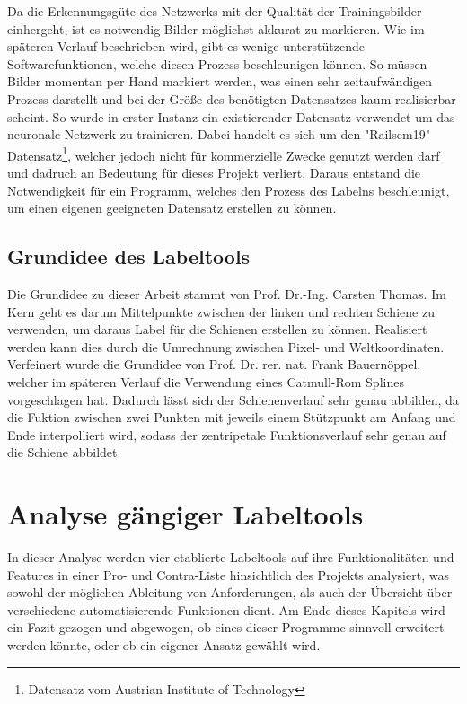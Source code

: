 \documentclass[11pt]{scrartcl}
\begin{document}
Da die Erkennungsgüte des Netzwerks mit der Qualität der Trainingsbilder einhergeht, ist es notwendig Bilder möglichst akkurat zu markieren. Wie im späteren Verlauf beschrieben wird, gibt es  wenige unterstützende Softwarefunktionen, welche diesen Prozess beschleunigen können. So müssen Bilder momentan per Hand markiert werden, was einen sehr zeitaufwändigen Prozess darstellt und bei der Größe des benötigten Datensatzes kaum realisierbar scheint. So wurde in erster Instanz ein existierender Datensatz verwendet um das neuronale Netzwerk zu trainieren. Dabei handelt es sich um den "Railsem19" Datensatz\footnote{Datensatz vom Austrian Institute of Technology}, welcher jedoch nicht für kommerzielle Zwecke genutzt werden darf und dadruch an Bedeutung für dieses Projekt verliert.
Daraus entstand die Notwendigkeit für ein Programm, welches den Prozess des Labelns beschleunigt, um einen eigenen geeigneten Datensatz erstellen zu können. 

\subsection{Grundidee des Labeltools}
\label{sec:Grundidee des Labeltools}

Die Grundidee zu dieser Arbeit stammt von Prof. Dr.-Ing. Carsten Thomas. Im Kern geht es darum Mittelpunkte zwischen der linken und rechten Schiene zu verwenden, um daraus Label für die Schienen erstellen zu können. Realisiert werden kann dies durch die Umrechnung zwischen Pixel- und Weltkoordinaten. Verfeinert wurde die Grundidee von Prof. Dr. rer. nat. Frank Bauernöppel, welcher im späteren Verlauf die Verwendung eines Catmull-Rom Splines vorgeschlagen hat.  Dadurch lässt sich der Schienenverlauf sehr genau abbilden, da die Fuktion zwischen zwei Punkten mit jeweils einem Stützpunkt am Anfang und Ende interpolliert wird, sodass der zentripetale Funktionsverlauf sehr genau auf die Schiene abbildet.

\newpage



\section{Analyse gängiger Labeltools}
\label{sec:Analyse gängiger Labeltools}
In dieser Analyse werden vier etablierte Labeltools auf ihre Funktionalitäten und Features in einer Pro- und Contra-Liste hinsichtlich des Projekts analysiert, was sowohl der möglichen Ableitung von Anforderungen, als auch der Übersicht über verschiedene automatisierende Funktionen dient. Am Ende dieses Kapitels wird ein Fazit gezogen und abgewogen, ob eines dieser Programme sinnvoll erweitert werden könnte, oder ob ein eigener Ansatz gewählt wird.
\end{document}
